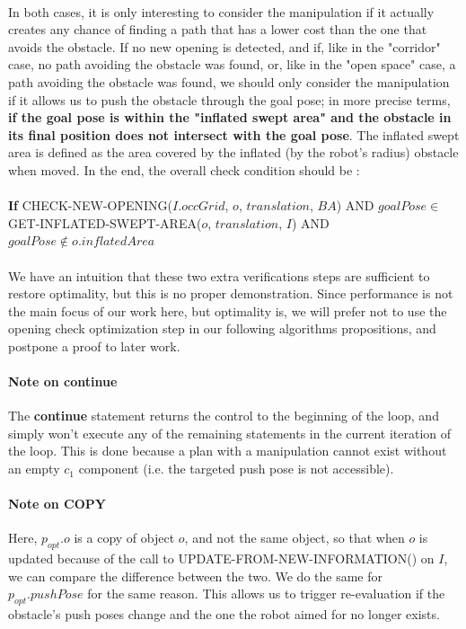 \paragraph{} In both cases, it is only interesting to consider the manipulation if it actually creates any chance of finding a path that has a lower cost than the one that avoids the obstacle. If no new opening is detected, and if, like in the "corridor" case, no path avoiding the obstacle was found, or, like in the "open space" case, a path avoiding the obstacle was found, we should only consider the manipulation if it allows us to push the obstacle through the goal pose; in more precise terms, \textbf{if the goal pose is within the "inflated swept area" and the obstacle in its final position does not intersect with the goal pose}. The inflated swept area is defined as the area covered by the inflated (by the robot's radius) obstacle when moved. In the end, the overall check condition should be :

\paragraph{} \textbf{If} CHECK-NEW-OPENING($I.occGrid$, $o$, $translation$, $BA$) AND $goalPose \in$ GET-INFLATED-SWEPT-AREA($o$, $translation$, $I$) AND $goalPose \not\in o.inflatedArea$

\paragraph{} We have an intuition that these two extra verifications steps are sufficient to restore optimality, but this is no proper demonstration. Since performance is not the main focus of our work here, but optimality is, we will prefer not to use the opening check optimization step in our following algorithms propositions, and postpone a proof to later work.

\paragraph{Note on \textbf{continue}}\label{continue_note} The \textbf{continue} statement returns the control to the beginning of the loop, and simply won't execute any of the remaining statements in the current iteration of the loop. This is done because a plan with a manipulation cannot exist without an empty $c_{1}$ component (i.e. the targeted push pose is not accessible).

\paragraph{Note on COPY}\label{copy_note} Here, $p_{opt}.o$ is a copy of object $o$, and not the same object, so that when $o$ is updated because of the call to UPDATE-FROM-NEW-INFORMATION() on $I$, we can compare the difference between the two. We do the same for $p_{opt}.pushPose$ for the same reason. This allows us to trigger re-evaluation if the obstacle's push poses change and the one the robot aimed for no longer exists.

